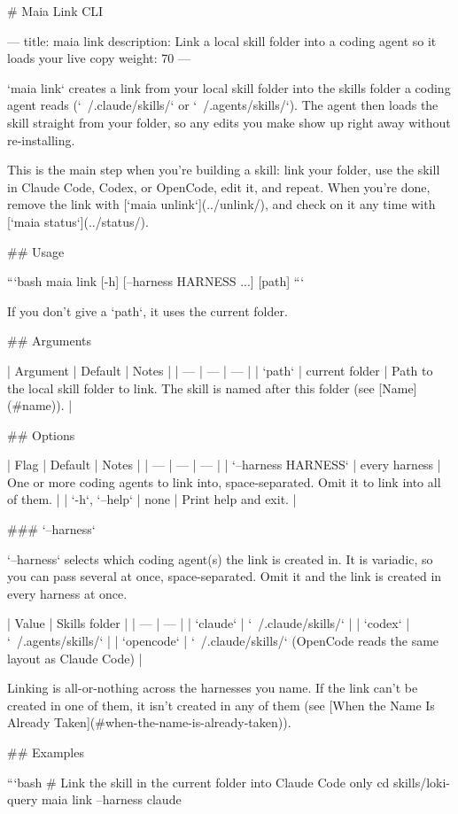 # Maia Link CLI

---
title: maia link
description: Link a local skill folder into a coding agent so it loads your live copy
weight: 70
---

`maia link` creates a link from your local skill folder into the skills folder a coding agent reads (`~/.claude/skills/` or `~/.agents/skills/`).
The agent then loads the skill straight from your folder, so any edits you make show up right away without re-installing.

This is the main step when you're building a skill: link your folder, use the skill in Claude Code, Codex, or OpenCode, edit it, and repeat.
When you're done, remove the link with [`maia unlink`](../unlink/), and check on it any time with [`maia status`](../status/).

## Usage

```bash
maia link [-h] [--harness HARNESS ...] [path]
```

If you don't give a `path`, it uses the current folder.

## Arguments

| Argument | Default | Notes |
| --- | --- | --- |
| `path` | current folder | Path to the local skill folder to link. The skill is named after this folder (see [Name](#name)). |

## Options

| Flag | Default | Notes |
| --- | --- | --- |
| `--harness HARNESS` | every harness | One or more coding agents to link into, space-separated. Omit it to link into all of them. |
| `-h`, `--help` | none | Print help and exit. |

### `--harness`

`--harness` selects which coding agent(s) the link is created in.
It is variadic, so you can pass several at once, space-separated.
Omit it and the link is created in every harness at once.

| Value | Skills folder |
| --- | --- |
| `claude` | `~/.claude/skills/` |
| `codex` | `~/.agents/skills/` |
| `opencode` | `~/.claude/skills/` (OpenCode reads the same layout as Claude Code) |

Linking is all-or-nothing across the harnesses you name.
If the link can't be created in one of them, it isn't created in any of them (see [When the Name Is Already Taken](#when-the-name-is-already-taken)).

## Examples

```bash
# Link the skill in the current folder into Claude Code only
cd skills/loki-query
maia link --harness claude

